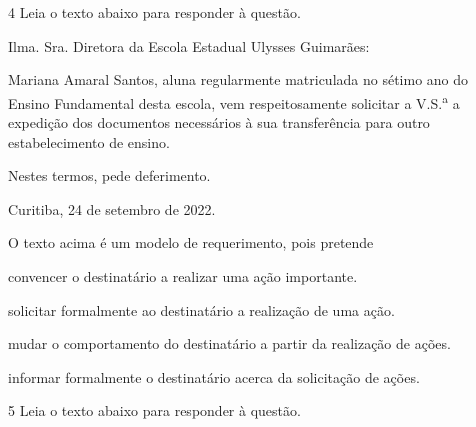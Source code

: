 \pagebreak

\num{4} Leia o texto abaixo para responder à questão.

\begin{myquote}

Ilma. Sra. Diretora da Escola Estadual Ulysses Guimarães:

Mariana Amaral Santos, aluna regularmente matriculada no sétimo ano do
Ensino Fundamental desta escola, vem respeitosamente solicitar a V.S.\textsuperscript{a} a
expedição dos documentos necessários à sua transferência para outro
estabelecimento de ensino.

Nestes termos, pede deferimento.

Curitiba, 24 de setembro de 2022.


\end{myquote}

O texto acima é um modelo de requerimento, pois pretende

\begin{escolha} 

\item convencer o destinatário a realizar uma ação importante.

\item solicitar formalmente ao destinatário a realização de uma ação.

\item mudar o comportamento do destinatário a partir da realização de ações.

\item informar formalmente o destinatário acerca da solicitação de ações.

\end{escolha}

\num{5} Leia o texto abaixo para responder à questão.

